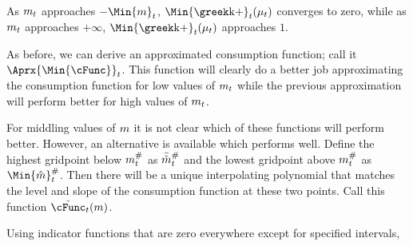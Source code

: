   As $m_{t}$ approaches
  $-\Min{m}_{\prd}$, $\Min{\koppa}_{\prd}(\mu_{\prd})$ converges to zero, while as $m_{t}$
  approaches $+\infty$, $\Min{\koppa}_{\prd}(\mu_{\prd})$ approaches $1$.

  As before, we can derive an approximated consumption function; call it $\Aprx{\Min{\cFunc}}_{\prd}$.  This function will clearly do a better job approximating the consumption function for low values of $m_{t}$ while the previous approximation will perform better for high values of $m_{t}$.

  For middling values of $m$ it is not clear which of these functions will perform better.  However, an alternative is available which performs well.  Define the highest gridpoint below $m_{t}^{\#}$ as $\bar{\check{m}}_{t}^{\#}$ and the lowest gridpoint above $m_{t}^{\#}$ as $\Min{\hat{\mNrm}}_{\prd}^{\#}$.  Then there will be a unique interpolating polynomial that matches the level and slope of the consumption function at these two points.  Call this function $\tilde{\cFunc}_{\prd}(\mNrm)$.

  Using indicator functions that are zero everywhere except for specified intervals,
